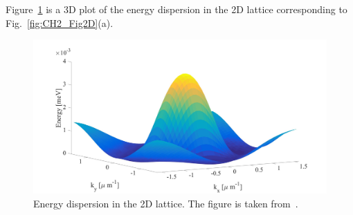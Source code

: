 Figure~\ref{fig:AP2_s-4} is a 3D plot of the energy dispersion in the 2D lattice corresponding to Fig.~\ref{fig:CH2_Fig2D}(a).

\begin{figure}[!tb]
\centering
\includegraphics[height=0.4\linewidth]{Fig/Ap2/Bands_surf.jpg}
\caption[Ground state dispersion in 3D]{Energy dispersion in the 2D lattice. The figure is taken from~\cite{Sun:2017ab}.}
\label{fig:AP2_s-4}
\end{figure}
